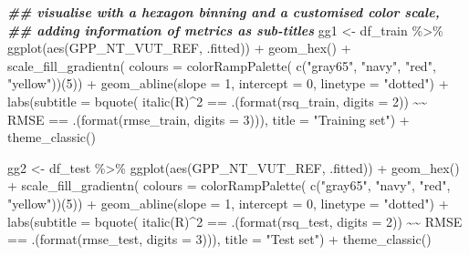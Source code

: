\documentclass[
]{book}
\newenvironment{Shaded}{\begin{snugshade}}{\end{snugshade}}
\newcommand{\AttributeTok}[1]{\textcolor[rgb]{0.77,0.63,0.00}{#1}}
\newcommand{\DecValTok}[1]{\textcolor[rgb]{0.00,0.00,0.81}{#1}}
\newcommand{\DocumentationTok}[1]{\textcolor[rgb]{0.56,0.35,0.01}{\textbf{\textit{#1}}}}
\newcommand{\ErrorTok}[1]{\textcolor[rgb]{0.64,0.00,0.00}{\textbf{#1}}}
\newcommand{\FunctionTok}[1]{\textcolor[rgb]{0.00,0.00,0.00}{#1}}
\newcommand{\NormalTok}[1]{#1}
\newcommand{\OtherTok}[1]{\textcolor[rgb]{0.56,0.35,0.01}{#1}}
\newcommand{\SpecialCharTok}[1]{\textcolor[rgb]{0.00,0.00,0.00}{#1}}
\newcommand{\StringTok}[1]{\textcolor[rgb]{0.31,0.60,0.02}{#1}}
\begin{document}
\begin{Shaded}
\begin{Highlighting}[]
  \DocumentationTok{\#\# visualise with a hexagon binning and a customised color scale,}
  \DocumentationTok{\#\# adding information of metrics as sub{-}titles}
\NormalTok{  gg1 }\OtherTok{\textless{}{-}}\NormalTok{ df\_train }\SpecialCharTok{\%\textgreater{}\%} 
    \FunctionTok{ggplot}\NormalTok{(}\FunctionTok{aes}\NormalTok{(GPP\_NT\_VUT\_REF, .fitted)) }\SpecialCharTok{+}
    \FunctionTok{geom\_hex}\NormalTok{() }\SpecialCharTok{+}
    \FunctionTok{scale\_fill\_gradientn}\NormalTok{(}
      \AttributeTok{colours =} \FunctionTok{colorRampPalette}\NormalTok{( }\FunctionTok{c}\NormalTok{(}\StringTok{"gray65"}\NormalTok{, }\StringTok{"navy"}\NormalTok{, }\StringTok{"red"}\NormalTok{, }\StringTok{"yellow"}\NormalTok{))(}\DecValTok{5}\NormalTok{)) }\SpecialCharTok{+}
    \FunctionTok{geom\_abline}\NormalTok{(}\AttributeTok{slope =} \DecValTok{1}\NormalTok{, }\AttributeTok{intercept =} \DecValTok{0}\NormalTok{, }\AttributeTok{linetype =} \StringTok{"dotted"}\NormalTok{) }\SpecialCharTok{+}
    \FunctionTok{labs}\NormalTok{(}\AttributeTok{subtitle =} \FunctionTok{bquote}\NormalTok{( }\FunctionTok{italic}\NormalTok{(R)}\SpecialCharTok{\^{}}\DecValTok{2} \SpecialCharTok{==}\NormalTok{ .(}\FunctionTok{format}\NormalTok{(rsq\_train, }\AttributeTok{digits =} \DecValTok{2}\NormalTok{)) }\SpecialCharTok{\textasciitilde{}}\ErrorTok{\textasciitilde{}}
\NormalTok{                            RMSE }\SpecialCharTok{==}\NormalTok{ .(}\FunctionTok{format}\NormalTok{(rmse\_train, }\AttributeTok{digits =} \DecValTok{3}\NormalTok{))),}
         \AttributeTok{title =} \StringTok{"Training set"}\NormalTok{) }\SpecialCharTok{+}
    \FunctionTok{theme\_classic}\NormalTok{()}
  
\NormalTok{  gg2 }\OtherTok{\textless{}{-}}\NormalTok{ df\_test }\SpecialCharTok{\%\textgreater{}\%} 
    \FunctionTok{ggplot}\NormalTok{(}\FunctionTok{aes}\NormalTok{(GPP\_NT\_VUT\_REF, .fitted)) }\SpecialCharTok{+}
    \FunctionTok{geom\_hex}\NormalTok{() }\SpecialCharTok{+}
    \FunctionTok{scale\_fill\_gradientn}\NormalTok{(}
      \AttributeTok{colours =} \FunctionTok{colorRampPalette}\NormalTok{( }\FunctionTok{c}\NormalTok{(}\StringTok{"gray65"}\NormalTok{, }\StringTok{"navy"}\NormalTok{, }\StringTok{"red"}\NormalTok{, }\StringTok{"yellow"}\NormalTok{))(}\DecValTok{5}\NormalTok{)) }\SpecialCharTok{+}
    \FunctionTok{geom\_abline}\NormalTok{(}\AttributeTok{slope =} \DecValTok{1}\NormalTok{, }\AttributeTok{intercept =} \DecValTok{0}\NormalTok{, }\AttributeTok{linetype =} \StringTok{"dotted"}\NormalTok{) }\SpecialCharTok{+}
    \FunctionTok{labs}\NormalTok{(}\AttributeTok{subtitle =} \FunctionTok{bquote}\NormalTok{( }\FunctionTok{italic}\NormalTok{(R)}\SpecialCharTok{\^{}}\DecValTok{2} \SpecialCharTok{==}\NormalTok{ .(}\FunctionTok{format}\NormalTok{(rsq\_test, }\AttributeTok{digits =} \DecValTok{2}\NormalTok{)) }\SpecialCharTok{\textasciitilde{}}\ErrorTok{\textasciitilde{}}
\NormalTok{                            RMSE }\SpecialCharTok{==}\NormalTok{ .(}\FunctionTok{format}\NormalTok{(rmse\_test, }\AttributeTok{digits =} \DecValTok{3}\NormalTok{))),}
         \AttributeTok{title =} \StringTok{"Test set"}\NormalTok{) }\SpecialCharTok{+}
    \FunctionTok{theme\_classic}\NormalTok{()}
  

\end{Highlighting}
\end{Shaded}
\end{document}

